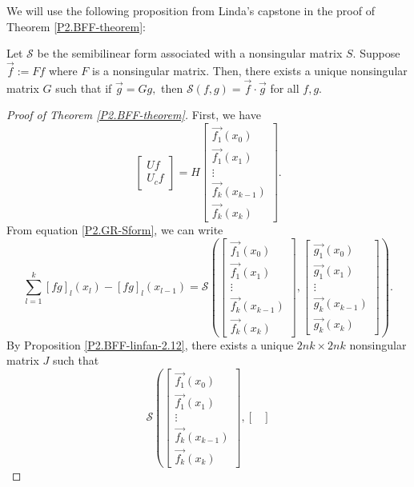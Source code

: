 \documentclass[10pt,reqno,oneside,a4paper]{article}
\begin{document}
We will use the following proposition from Linda's capstone \cite{linfan} in the proof of Theorem \ref{P2.BFF-theorem}:
\begin{prop}\label{P2.BFF-linfan-2.12}
Let $\mathcal{S}$ be the semibilinear form associated with a nonsingular matrix $S.$ Suppose $\vec{f} := Ff$ where $F$ is a nonsingular matrix. Then, there exists a unique nonsingular matrix $G$ such that if $\vec{g} =Gg,$ then $\mathcal{S}(f,g) = \vec{f}\cdot \vec{g}$ for all $f,g.$
\end{prop}
\begin{proof}[Proof of Theorem \ref{P2.BFF-theorem}]
First, we have 
\[ 
\begin{bmatrix}
Uf \\
U_c f
\end{bmatrix} = 
H
\begin{bmatrix}
\vec{f_1}(x_{0})  \\
\vec{f_1}(x_1) \\
\vdots \\
\vec{f_k}(x_{k-1})  \\
\vec{f_k}(x_k)
\end{bmatrix}.
\]
From equation \eqref{P2.GR-Sform}, we can write 
\[
\sum_{l=1}^{k} [fg]_l(x_l) - [fg]_l(x_{l-1}) = \mathcal{S} \left( \begin{bmatrix}
\vec{f_1}(x_{0})  \\
\vec{f_1}(x_1) \\
\vdots \\
\vec{f_k}(x_{k-1})  \\
\vec{f_k}(x_k)
\end{bmatrix},  
\begin{bmatrix}
\vec{g_1}(x_{0})  \\
\vec{g_1}(x_1) \\
\vdots \\
\vec{g_k}(x_{k-1})  \\
\vec{g_k}(x_k)
\end{bmatrix}
\right).
\]
By Proposition \ref{P2.BFF-linfan-2.12}, there exists a unique $2nk \times 2nk $ nonsingular matrix $J$ such that 
$$\mathcal{S} \left( \begin{bmatrix}
\vec{f_1}(x_{0})  \\
\vec{f_1}(x_1) \\
\vdots \\
\vec{f_k}(x_{k-1})  \\
\vec{f_k}(x_k)
\end{bmatrix},  
\begin{bmatrix}

\end{bmatrix}$$
\end{proof}
\end{document}
